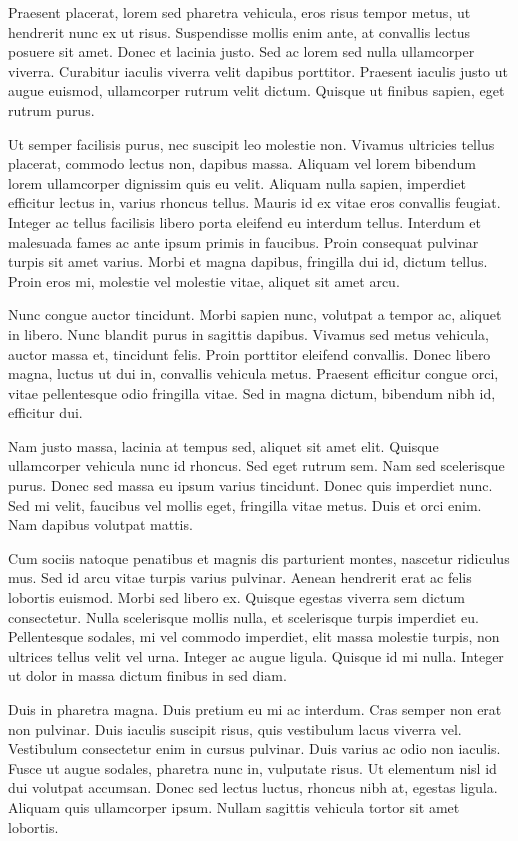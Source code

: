 \documentclass[11pt,]{article}
\begin{document}
Praesent placerat, lorem sed pharetra vehicula, eros risus tempor metus,
ut hendrerit nunc ex ut risus. Suspendisse mollis enim ante, at
convallis lectus posuere sit amet. Donec et lacinia justo. Sed ac lorem
sed nulla ullamcorper viverra. Curabitur iaculis viverra velit dapibus
porttitor. Praesent iaculis justo ut augue euismod, ullamcorper rutrum
velit dictum. Quisque ut finibus sapien, eget rutrum purus.

Ut semper facilisis purus, nec suscipit leo molestie non. Vivamus
ultricies tellus placerat, commodo lectus non, dapibus massa. Aliquam
vel lorem bibendum lorem ullamcorper dignissim quis eu velit. Aliquam
nulla sapien, imperdiet efficitur lectus in, varius rhoncus tellus.
Mauris id ex vitae eros convallis feugiat. Integer ac tellus facilisis
libero porta eleifend eu interdum tellus. Interdum et malesuada fames ac
ante ipsum primis in faucibus. Proin consequat pulvinar turpis sit amet
varius. Morbi et magna dapibus, fringilla dui id, dictum tellus. Proin
eros mi, molestie vel molestie vitae, aliquet sit amet arcu.

Nunc congue auctor tincidunt. Morbi sapien nunc, volutpat a tempor ac,
aliquet in libero. Nunc blandit purus in sagittis dapibus. Vivamus sed
metus vehicula, auctor massa et, tincidunt felis. Proin porttitor
eleifend convallis. Donec libero magna, luctus ut dui in, convallis
vehicula metus. Praesent efficitur congue orci, vitae pellentesque odio
fringilla vitae. Sed in magna dictum, bibendum nibh id, efficitur dui.

Nam justo massa, lacinia at tempus sed, aliquet sit amet elit. Quisque
ullamcorper vehicula nunc id rhoncus. Sed eget rutrum sem. Nam sed
scelerisque purus. Donec sed massa eu ipsum varius tincidunt. Donec quis
imperdiet nunc. Sed mi velit, faucibus vel mollis eget, fringilla vitae
metus. Duis et orci enim. Nam dapibus volutpat mattis.

Cum sociis natoque penatibus et magnis dis parturient montes, nascetur
ridiculus mus. Sed id arcu vitae turpis varius pulvinar. Aenean
hendrerit erat ac felis lobortis euismod. Morbi sed libero ex. Quisque
egestas viverra sem dictum consectetur. Nulla scelerisque mollis nulla,
et scelerisque turpis imperdiet eu. Pellentesque sodales, mi vel commodo
imperdiet, elit massa molestie turpis, non ultrices tellus velit vel
urna. Integer ac augue ligula. Quisque id mi nulla. Integer ut dolor in
massa dictum finibus in sed diam.

Duis in pharetra magna. Duis pretium eu mi ac interdum. Cras semper non
erat non pulvinar. Duis iaculis suscipit risus, quis vestibulum lacus
viverra vel. Vestibulum consectetur enim in cursus pulvinar. Duis varius
ac odio non iaculis. Fusce ut augue sodales, pharetra nunc in, vulputate
risus. Ut elementum nisl id dui volutpat accumsan. Donec sed lectus
luctus, rhoncus nibh at, egestas ligula. Aliquam quis ullamcorper ipsum.
Nullam sagittis vehicula tortor sit amet lobortis.
\end{document}
